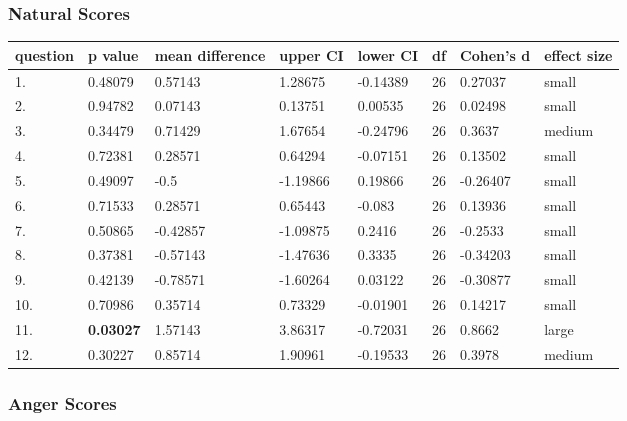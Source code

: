 \documentclass[11pt, twoside, reqno]{book}
\begin{document}
\subsubsection{\textbf{Natural Scores}}

\begin{table}[h!]
    \raggedright
    \begin{tabular}{|l|l|l|l|l|l|l|l|}
    \hline
        question & p value & mean difference & upper CI & lower CI & df & Cohen's d & effect size \\ \hline
        1. & 0.48079 & 0.57143 & 1.28675 & -0.14389 & 26 & 0.27037 & small \\ \hline
        2. & 0.94782 & 0.07143 & 0.13751 & 0.00535 & 26 & 0.02498 & small \\ \hline
        3. & 0.34479 & 0.71429 & 1.67654 & -0.24796 & 26 & 0.3637 & medium  \\ \hline
        4. & 0.72381 & 0.28571 & 0.64294 & -0.07151 & 26 & 0.13502 & small \\ \hline
        5. & 0.49097 & -0.5 & -1.19866 & 0.19866 & 26 & -0.26407 & small  \\ \hline
        6. & 0.71533 & 0.28571 & 0.65443 & -0.083 & 26 & 0.13936 & small \\ \hline
        7. & 0.50865 & -0.42857 & -1.09875 & 0.2416 & 26 & -0.2533 & small \\ \hline
        8. & 0.37381 & -0.57143 & -1.47636 & 0.3335 & 26 & -0.34203 & small \\ \hline
        9. & 0.42139 & -0.78571 & -1.60264 & 0.03122 & 26 & -0.30877 & small \\ \hline
        10. & 0.70986 & 0.35714 & 0.73329 & -0.01901 & 26 & 0.14217 & small \\ \hline
        11. & \textbf{0.03027} & 1.57143 & 3.86317 & -0.72031 & 26 & 0.8662 & large \\ \hline
        12. & 0.30227 & 0.85714 & 1.90961 & -0.19533 & 26 & 0.3978 & medium \\ \hline
    \end{tabular}
\end{table}

\subsubsection{\textbf{Anger Scores}}
\end{document}
